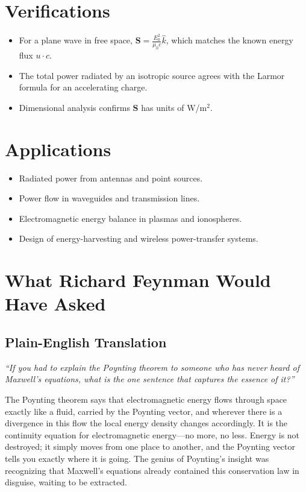 \section*{Verifications}

\begin{itemize}
    \item For a plane wave in free space, $\mathbf{S} = \frac{E_0^2}{\mu_0 c}\hat{k}$, which matches the known energy flux $u \cdot c$.
    \item The total power radiated by an isotropic source agrees with the Larmor formula for an accelerating charge.
    \item Dimensional analysis confirms $\mathbf{S}$ has units of W/m$^2$.
\end{itemize}
\section*{Applications}

\begin{itemize}
    \item Radiated power from antennas and point sources.
    \item Power flow in waveguides and transmission lines.
    \item Electromagnetic energy balance in plasmas and ionospheres.
    \item Design of energy-harvesting and wireless power-transfer systems.
\end{itemize}
\section*{What Richard Feynman Would Have Asked}

\subsection*{Plain-English Translation}
\textit{``If you had to explain the Poynting theorem to someone who has never heard of Maxwell's equations, what is the one sentence that captures the essence of it?''}

The Poynting theorem says that electromagnetic energy flows through space exactly like a fluid, carried by the Poynting vector, and wherever there is a divergence in this flow the local energy density changes accordingly. It is the continuity equation for electromagnetic energy---no more, no less. Energy is not destroyed; it simply moves from one place to another, and the Poynting vector tells you exactly where it is going. The genius of Poynting's insight was recognizing that Maxwell's equations already contained this conservation law in disguise, waiting to be extracted.

